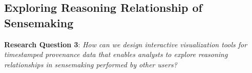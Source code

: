%
%
%


\subsection{Exploring Reasoning Relationship of Sensemaking}
\textbf{Research Question 3}: \emph{How can we design interactive visualization tools for timestamped provenance data that enables analysts to explore reasoning relationships in sensemaking performed by other users?}

